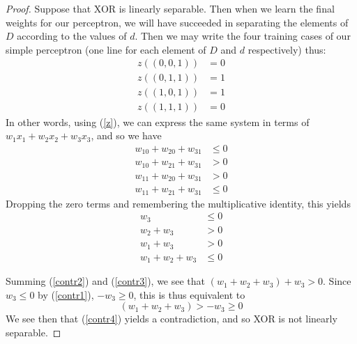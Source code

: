 \documentclass[12 pt]{report}
\begin{document}
\begin{proof}
  Suppose that XOR is linearly separable.  Then when we learn the
  final weights for our perceptron, we will have succeeded in
  separating the elements of $D$ according to the values of $d$.  Then
  we may write the four training cases of our simple perceptron (one
  line for each element of $D$ and $d$ respectively) thus:
  \begin{align*}
    z((0,0,1)) & = 0 \\
    z((0,1,1)) & = 1 \\
    z((1,0,1)) & = 1 \\
    z((1,1,1)) & = 0
  \end{align*}
  In other words, using (\ref{z}), we can express the same system in
  terms of $w_1x_1 + w_2x_2 + w_3x_3$, and so we have
  \begin{align*}
    w_10 + w_20 + w_31 & \le 0 \\
    w_10 + w_21 + w_31  & > 0 \\
    w_11 + w_20 + w_31  & > 0 \\
    w_11 + w_21 + w_31  & \le 0
  \end{align*}
  Dropping the zero terms and remembering the multiplicative identity,
  this yields
  \begin{align}
    \label{contr1}
    w_3 & \le 0 \\
    \label{contr2}
    w_2 + w_3  & > 0 \\
    \label{contr3}
    w_1 + w_3   & > 0 \\
    \label{contr4}
    w_1 + w_2  + w_3 & \le 0
\end{align}

Summing (\ref{contr2}) and (\ref{contr3}), we see that
$(w_1+w_2+w_3) + w_3 > 0$.  Since $w_3\le 0$ by (\ref{contr1}),
$-w_3\ge 0$, this is thus equivalent to
\begin{displaymath}
  (w_1+w_2+w_3) > -w_3 \ge 0
\end{displaymath}
We see then that (\ref{contr4}) yields a contradiction, and so XOR is
not linearly separable.

\end{proof}
\end{document}
